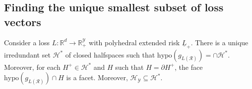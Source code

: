 \documentclass[twoside,11pt]{article}
\newcommand{\Comments}{1}
\newcommand{\mynote}[2]{\ifnum\Comments=1\textcolor{#1}{#2}\fi}
\newcommand{\raf}[1]{\mynote{darkgreen}{[RF: #1]}}
\newcommand{\reals}{\mathbb{R}}
\renewcommand{\H}{\mathcal{H}}
\newcommand{\R}{\mathcal{R}}
\newcommand{\V}{\mathcal{V}}
\newcommand{\Y}{\mathcal{Y}}
\newcommand{\risk}[1]{\underline{#1}}
\newcommand{\inprod}[2]{\langle #1, #2 \rangle}%
\newcommand{\hyp}{\mathrm{hypo}}
\begin{document}
\subsection{Finding the unique smallest subset of loss vectors}



\begin{lemma}\label{lem:G-unique-facets-Hstar}
  Consider a loss $L : \reals^d \to \reals^\Y_+$ with polyhedral extended risk $\risk L_+$.
  There is a unique irredundant set $\H^*$ of closed halfspaces such that $\hyp(g_{L(\R)}) = \cap \H^*$. 
  Moreover, for each $H^+ \in\H^*$ and $H$ such that $H = \partial H^+$, the face $\hyp(g_{L(\R)}) \cap H$ is a facet. 
  Moreover, $\H_\Y \subseteq \H^*$. 
\end{lemma}
\end{document}
